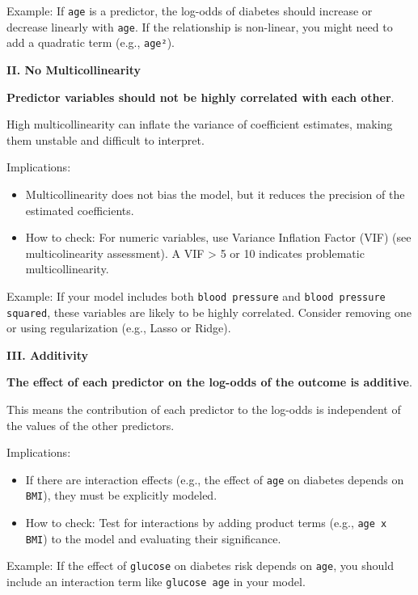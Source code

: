 \documentclass{article}
\providecommand{\tightlist}{%
  \setlength{\itemsep}{0pt}\setlength{\parskip}{0pt}}
\begin{document}
Example: If \texttt{age} is a predictor, the log-odds of
diabetes should increase or decrease linearly with \texttt{age}. If the
relationship is non-linear, you might need to add a quadratic term
(e.g., \texttt{age²}).

\medskip

\textbf{II. No Multicollinearity}

\textbf{Predictor variables should not be highly correlated with each other}. 

High multicollinearity can inflate the variance of coefficient estimates, 
making them unstable and difficult to interpret.

Implications:

\begin{itemize}
\tightlist
\item
  Multicollinearity does not bias the model, but it reduces the
  precision of the estimated coefficients.
\item
  How to check: For numeric variables, use Variance Inflation Factor (VIF) 
  (see multicolinearity assessment). A   VIF \textgreater{} 5 or 10 
  indicates problematic multicollinearity.
\end{itemize}

Example: If your model includes both \texttt{blood pressure}
and \texttt{blood pressure squared}, these variables are likely to be
highly correlated. Consider removing one or using regularization (e.g.,
Lasso or Ridge).

\medskip

\textbf{III. Additivity}

\textbf{The effect of each predictor on the log-odds of the
outcome is additive}. 

This means the contribution of each predictor to the log-odds 
is independent of the values of the other predictors.

Implications:

\begin{itemize}
\tightlist
\item
  If there are interaction effects (e.g., the effect of
  \texttt{age} on diabetes depends on \texttt{BMI}), they must be
  explicitly modeled.
\item
  How to check: Test for interactions by adding product terms
  (e.g., \texttt{age x BMI}) to the model and evaluating their
  significance.
\end{itemize}

Example: If the effect of \texttt{glucose} on diabetes risk
depends on \texttt{age}, you should include an interaction term like
\texttt{glucose age} in your model.
\end{document}
